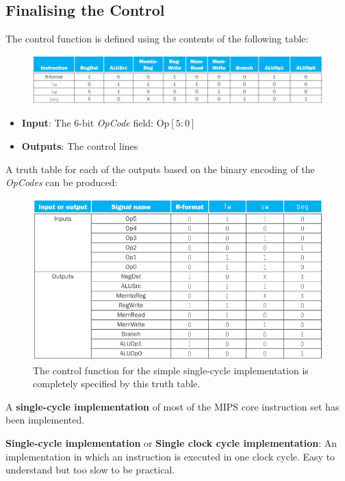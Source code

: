 \documentclass[10pt,a4paper]{article}
\begin{document}
\pagebreak

\subsection{Finalising the Control}

The control function is defined using the contents of the following table: \par 
\begin{figure} [h!]
    \centering
    \includegraphics[scale=0.6]{R type control.JPG}
\end{figure}
\begin{itemize}
    \item \textbf{Input}: The $6$-bit \textit{OpCode} field: $\text{Op}[5:0]$
    \item \textbf{Outputs}: The control lines
\end{itemize}
A truth table for each of the outputs based on the binary encoding of the \textit{OpCodes} can be
produced:
\begin{figure} [h!]
    \centering
    \includegraphics[scale=0.75]{Control table.JPG}
    \caption{The control function for the simple single-cycle implementation is completely speciﬁed by this truth table.}
\end{figure}

A \textbf{single-cycle implementation} of most of the MIPS core instruction set has been
implemented. 
\begin{tcolorbox}[breakable,colback=white]
\textbf{Single-cycle implementation} or \textbf{Single clock cycle implementation}: An
implementation in which an instruction is executed in one clock cycle. Easy to understand but too slow to be practical. 
\end{tcolorbox}
\end{document}
